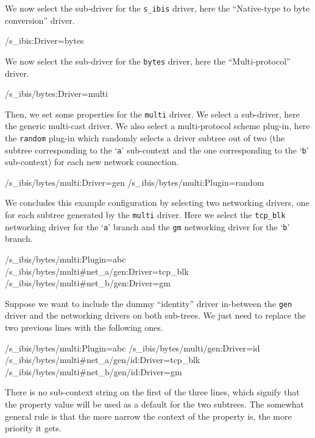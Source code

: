 \documentclass[11pt]{book}
\begin{document}
We now select the sub-driver for the \texttt{s\_ibis} driver, here the
``Native-type to byte conversion'' driver.
\begin{Miniverb}

  /s_ibis:Driver=bytes

\end{Miniverb}

We now select the sub-driver for the \texttt{bytes} driver, here the
``Multi-protocol'' driver.
\begin{Miniverb}

  /s_ibis/bytes:Driver=multi

\end{Miniverb}

Then, we set some properties for the \texttt{multi} driver. We select
a sub-driver, here the generic multi-cast driver. We also select a
multi-protocol scheme plug-in, here the \texttt{random} plug-in which
randomly selects a driver subtree out of two (the subtree corresponding
to the `\texttt{a}' sub-context and the one corresponding to the
`\texttt{b}' sub-context) for each new network connection.
\begin{Miniverb}

  /s_ibis/bytes/multi:Driver=gen
  /s_ibis/bytes/multi:Plugin=random

\end{Miniverb}

We concludes this example configuration by selecting two networking
drivers, one for each subtree generated by the \texttt{multi} driver.
Here we select the \texttt{tcp\_blk} networking driver for the
`\texttt{a}' branch and the \texttt{gm} networking driver for the
`\texttt{b}' branch.
\begin{Miniverb}

  /s_ibis/bytes/multi:Plugin=abc
  /s_ibis/bytes/multi#net_a/gen:Driver=tcp_blk
  /s_ibis/bytes/multi#net_b/gen:Driver=gm

\end{Miniverb}

Suppose we want to include the dummy ``identity'' driver in-between
the \texttt{gen} driver and the networking drivers on both sub-trees.
We just need to replace the two previous lines with the following
ones.
\begin{Miniverb}

  /s_ibis/bytes/multi:Plugin=abc
  /s_ibis/bytes/multi/gen:Driver=id
  /s_ibis/bytes/multi#net_a/gen/id:Driver=tcp_blk
  /s_ibis/bytes/multi#net_b/gen/id:Driver=gm

\end{Miniverb}
There is no sub-context string on the first of the three lines, which
signify that the property value will be used as a default for the two
subtrees. The somewhat general rule is that the more narrow the
context of the property is, the more priority it gets.
\end{document}
